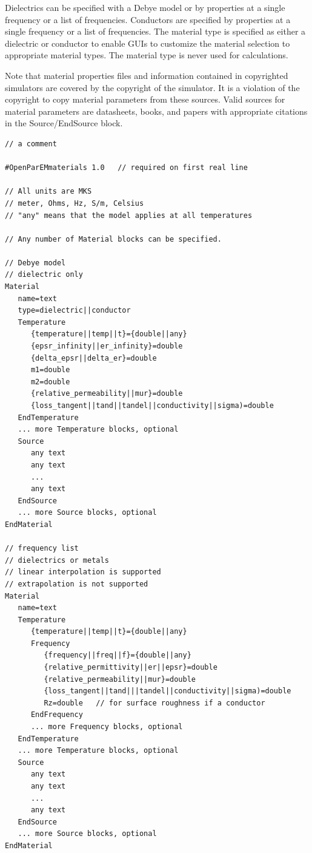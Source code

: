 \documentclass[titlepage]{article}
\renewcommand\_{\textunderscore\linebreak[1]}
\begin{document}
Dielectrics can be specified with a Debye model or by properties at a single frequency or a list of frequencies.  Conductors are specified by properties at a single frequency or a list of frequencies.  The material type is specified as either a dielectric or conductor to enable GUIs to customize the material selection to appropriate material types.  The material type is never used for calculations.

Note that material properties files and information contained in copyrighted simulators are covered by the copyright of the simulator.  It is a violation of the copyright to copy material parameters from these sources.  Valid sources for material parameters are datasheets, books, and papers with appropriate citations in the Source/EndSource block.
\newline

\begin{Verbatim}[fontsize=\small]
// a comment

#OpenParEMmaterials 1.0   // required on first real line

// All units are MKS
// meter, Ohms, Hz, S/m, Celsius
// "any" means that the model applies at all temperatures

// Any number of Material blocks can be specified.

// Debye model
// dielectric only
Material
   name=text
   type=dielectric||conductor
   Temperature
      {temperature||temp||t}={double||any}
      {epsr_infinity||er_infinity}=double
      {delta_epsr||delta_er}=double
      m1=double
      m2=double
      {relative_permeability||mur}=double
      {loss_tangent||tand||tandel||conductivity||sigma)=double
   EndTemperature
   ... more Temperature blocks, optional
   Source
      any text
      any text
      ...
      any text
   EndSource
   ... more Source blocks, optional
EndMaterial

// frequency list
// dielectrics or metals
// linear interpolation is supported 
// extrapolation is not supported
Material
   name=text
   Temperature
      {temperature||temp||t}={double||any}
      Frequency
         {frequency||freq||f}={double||any}
         {relative_permittivity||er||epsr}=double
         {relative_permeability||mur}=double
         {loss_tangent||tand|||tandel||conductivity||sigma)=double
         Rz=double   // for surface roughness if a conductor
      EndFrequency
      ... more Frequency blocks, optional
   EndTemperature
   ... more Temperature blocks, optional
   Source
      any text
      any text
      ...
      any text
   EndSource
   ... more Source blocks, optional
EndMaterial
\end{Verbatim}
\end{document}

